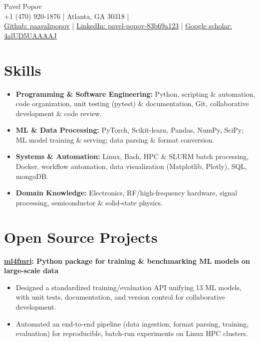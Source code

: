 \documentclass[11pt,a4paper]{article}
\begin{document}
\begin{center}
  {\Huge Pavel Popov}\\[0.5em]
  {\footnotesize +1 (470) 920-1876 \quad | \quad Atlanta, GA 30318} \quad | \\
  {\small \href{https://github.com/paavalipopov}{Github: paavalipopov} \quad | \quad
  \href{https://www.linkedin.com/in/pavel-popov-83b69a123/}{LinkedIn: pavel-popov-83b69a123} \quad | \quad
  \href{https://scholar.google.com/citations?user=4alUD5UAAAAJ}{Google scholar: 4alUD5UAAAAJ}}
\end{center}

\section*{Skills}
\begin{itemize}
[leftmargin=*,noitemsep]
\item \textbf{Programming \& Software Engineering:} Python, scripting \& automation, code organization, unit testing (pytest) \& documentation, Git, collaborative development \& code review.
\item \textbf{ML \& Data Processing:} PyTorch, Scikit-learn, Pandas, NumPy, SciPy; ML model training \& serving; data parsing \& format conversion.
\item \textbf{Systems \& Automation:} Linux, Bash, HPC \& SLURM batch processing, Docker, workflow automation, data visualization (Matplotlib, Plotly), SQL, mongoDB.
\item \textbf{Domain Knowledge:} Electronics, RF/high-frequency hardware, signal processing, semiconductor \& solid-state physics.
\end{itemize}

\section*{Open Source Projects}
\noindent\textbf{\href{https://pypi.org/project/ml4fmri/}{ml4fmri}: Python package for training \& benchmarking ML models on large-scale data}\\
[-2em]
\begin{itemize}[leftmargin=*,noitemsep]
    \item Designed a standardized training/evaluation API unifying 13 ML models, with unit tests, documentation, and version control for collaborative development.
    \item Automated an end-to-end pipeline (data ingestion, format parsing, training, evaluation) for reproducible, batch-run experiments on Linux HPC clusters.
\end{itemize}
\end{document}
